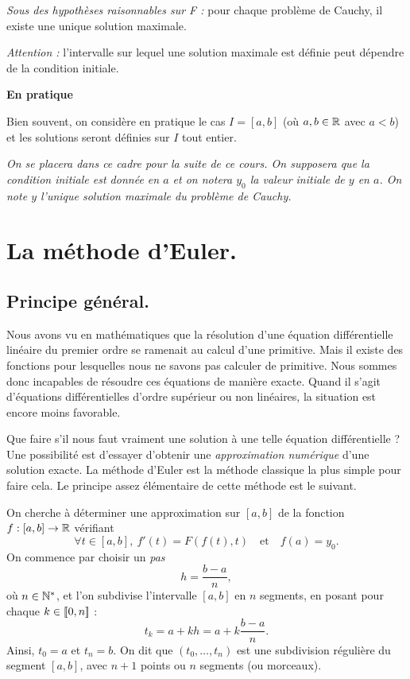 \emph{Sous des hypothèses raisonnables sur F :} pour chaque problème de Cauchy, il existe une unique solution
maximale.

\emph{Attention :} l'intervalle sur lequel une solution maximale est définie peut dépendre de
la condition initiale.

\begin{rem}
\textbf{En pratique}

Bien souvent, on considère en pratique le cas $I=[a,b]$ (où $a,b\in\mathbb{R}$ avec $a<b$) et les
solutions seront définies sur $I$ tout entier.

\emph{On se placera dans ce cadre pour la suite de ce cours.
On supposera que la condition initiale est donnée en $a$ et on notera
$y_{0}$ la valeur initiale de $y$ en $a$.
On note $y$ l'unique solution maximale du problème de Cauchy.}
\end{rem}

\section{La méthode d'Euler.}

\subsection{Principe général.}

Nous avons vu en mathématiques que la résolution d'une équation différentielle linéaire du premier 
ordre se ramenait au calcul d'une primitive. Mais il existe des fonctions pour lesquelles nous ne 
savons pas calculer de primitive. Nous sommes donc incapables de résoudre ces équations de manière 
exacte. Quand il s'agit d'équations différentielles d'ordre supérieur ou non linéaires, la 
situation est encore moins favorable.


Que faire s'il nous faut vraiment une solution à une telle équation différentielle ? Une 
possibilité est d'essayer d'obtenir une \emph{approximation numérique} d'une solution exacte. La 
méthode d'Euler est la méthode classique la plus simple pour faire cela. Le principe assez 
élémentaire de cette méthode est le suivant.


On cherche à déterminer une approximation sur $[a,b]$ de la fonction $f : [a,b] \to \mathbb{R}$ vérifiant 
\begin{equation*}
  \forall t \in [a,b],~ f'(t) = F(f(t),t) \quad\textrm{et}\quad f(a) = y_0. 
\end{equation*}
On commence par choisir un \emph{pas} 
\begin{equation*}
  h=\frac{b-a}{n},
\end{equation*}
où $n\in\mathbb{N}^{*}$, et l'on subdivise l'intervalle $[a,b]$ en $n$ segments, en posant pour chaque $k\in [\![0,n]\!]$ :
\begin{equation*}
  t_{k} = a + k h = a + k \dfrac{b-a}{n}. 
\end{equation*}
Ainsi, $t_0 = a$ et $t_n = b$. On dit que $(t_0,\dots,t_n)$ est une subdivision régulière du segment $[a,b]$, avec $n+1$ points ou $n$ segments (ou morceaux). 

